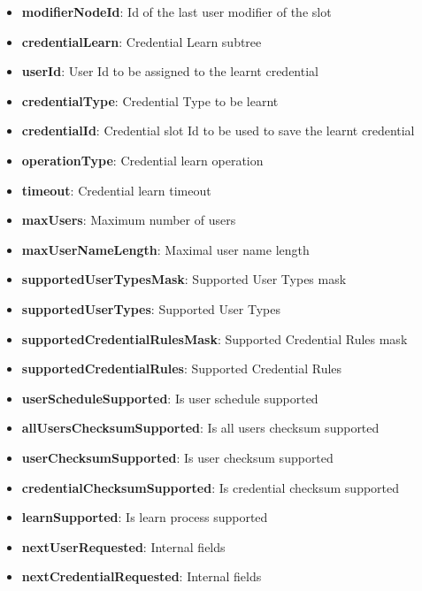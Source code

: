 \begin{itemize}
\item \qquad\qquad\qquad\textbf{modifierNodeId}: Id of the last user modifier of the slot
\item \textbf{credentialLearn}: Credential Learn subtree
\item \qquad\textbf{userId}: User Id to be assigned to the learnt credential
\item \qquad\textbf{credentialType}: Credential Type to be learnt
\item \qquad\textbf{credentialId}: Credential slot Id to be used to save the learnt credential
\item \qquad\textbf{operationType}: Credential learn operation
\item \qquad\textbf{timeout}: Credential learn timeout
\item \textbf{maxUsers}: Maximum number of users
\item \textbf{maxUserNameLength}: Maximal user name length
\item \textbf{supportedUserTypesMask}: Supported User Types mask
\item \textbf{supportedUserTypes}: Supported User Types
\item \textbf{supportedCredentialRulesMask}: Supported Credential Rules mask
\item \textbf{supportedCredentialRules}: Supported Credential Rules
\item \textbf{userScheduleSupported}: Is user schedule supported
\item \textbf{allUsersChecksumSupported}: Is all users checksum supported
\item \textbf{userChecksumSupported}: Is user checksum supported
\item \textbf{credentialChecksumSupported}: Is credential checksum supported
\item \textbf{learnSupported}: Is learn process supported
\item \textbf{nextUserRequested}: Internal fields
\item \textbf{nextCredentialRequested}: Internal fields
\end{itemize}

